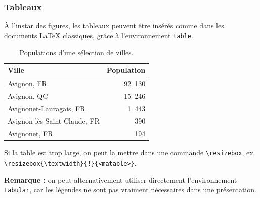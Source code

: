 \documentclass[10pt,    %
    french,             %
    xcolor=table,       %
    envcountsect,       %
    aspectratio=43      %
]{beamer}
\begin{document}
\begin{frame}
    \frametitle{Tableaux}

    À l'instar des figures, les tableaux peuvent être insérés comme dans les documents \LaTeX{} classiques, grâce à l'environnement \texttt{table}.

    \begin{table}[H]
        \centering
        \begin{tabular}{l r}
            \hline
	        \rowcolor{fgLightRed} 
            \textbf{Ville} & \textbf{Population} \\
            \hline
            Avignon, FR & 92~130 \\
            Avignon, QC & 15~246 \\
            Avignonet-Lauragais, FR & 1~443 \\
            Avignon-lès-Saint-Claude, FR & 390 \\
            Avignonet, FR & 194 \\
            \hline
        \end{tabular}
        \caption{Populations d'une sélection de villes.}
        \label{tab:population}
    \end{table}
    
    \vspace{-0.4cm}
    Si la table est trop large, on peut la mettre dans une commande \texttt{\textbackslash{}resizebox}, ex. \texttt{\textbackslash{}resizebox\{\textbackslash{}textwidth\}\{!\}\{<matable>\}}.
    
    
    
    

    \medskip
    \textbf{Remarque :} on peut alternativement utiliser directement l'environnement \texttt{tabular}, car les légendes ne sont pas vraiment nécessaires dans une présentation.
\end{frame}
    
\end{document}
